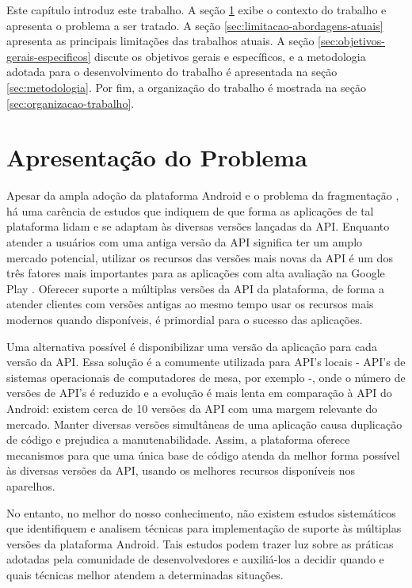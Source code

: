 Este capítulo introduz este trabalho. A seção \ref{sec:apresentacao-do-problema}
exibe o contexto do trabalho e apresenta o problema a ser tratado. A seção \ref{sec:limitacao-abordagens-atuais}
apresenta as principais limitações das trabalhos atuais. A seção \ref{sec:objetivos-gerais-especificos}
discute os objetivos gerais e específicos, e a metodologia adotada para o desenvolvimento
do trabalho é apresentada na seção \ref{sec:metodologia}. Por fim, a organização do trabalho
é mostrada na seção \ref{sec:organizacao-trabalho}.

\section{Apresentação do Problema} \label{sec:apresentacao-do-problema}

Apesar da ampla adoção da plataforma Android e o problema da fragmentação \cite{Park2013},
há uma carência de estudos que indiquem de que forma as aplicações de tal plataforma
lidam e se adaptam às diversas versões lançadas da API. 
Enquanto atender a usuários com uma antiga versão da API significa ter um amplo
mercado potencial, utilizar os recursos das versões mais novas da API é um dos três 
fatores mais importantes para as aplicações com alta avaliação na Google Play \cite{Tian2015}.
Oferecer suporte a múltiplas versões da API da plataforma, de forma a atender clientes
com versões antigas ao mesmo tempo usar os recursos mais modernos quando disponíveis,
é primordial para o sucesso das aplicações.

Uma alternativa possível é disponibilizar uma versão da aplicação para cada versão
da API. Essa solução é a comumente utilizada para API’s locais - API’s de sistemas
operacionais de computadores de mesa, por exemplo -, onde o número de versões de
API’s é reduzido e a evolução é mais lenta em comparação à API do Android: existem
cerca de 10 versões da API com uma margem relevante do mercado. Manter diversas
versões simultâneas de uma aplicação causa duplicação de código e prejudica a
manutenabilidade. %
Assim, a plataforma oferece mecanismos para que uma única base
de código atenda da melhor forma possível às diversas versões da API, usando os
melhores recursos disponíveis nos aparelhos.

No entanto, no melhor do nosso conhecimento, não existem estudos sistemáticos que
identifiquem e analisem técnicas para implementação de suporte às
múltiplas versões da plataforma Android. Tais estudos podem trazer luz sobre as
práticas adotadas pela comunidade de desenvolvedores e auxiliá-los a decidir
quando e quais técnicas melhor atendem a determinadas situações.

